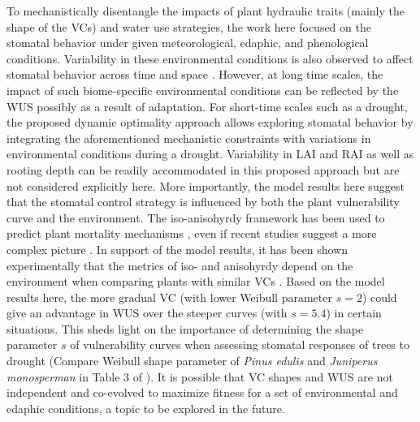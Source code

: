 \documentclass[utf8]{frontiersSCNS} %
\begin{document}
To mechanistically disentangle the impacts of plant hydraulic traits (mainly the shape of the VCs) and water use strategies, the work here focused on the stomatal behavior under given meteorological, edaphic, and phenological conditions. Variability in these environmental conditions is also observed to affect stomatal behavior across time and space \citep{feng2018beyond,novick2019beyond}. However, at long time scales, the impact of such biome-specific environmental conditions can be reflected by the WUS possibly as a result of adaptation. For short-time scales such as a drought, the proposed dynamic optimality approach allows exploring stomatal behavior by integrating the aforementioned mechanistic constraints with variations in environmental conditions during a drought. Variability in LAI and RAI as well as rooting depth can be readily accommodated in this proposed approach but are not considered explicitly here. More importantly, the model results here suggest that the stomatal control strategy is influenced by both the plant vulnerability curve and the environment. The iso-anisohyrdy framework has been used to predict plant mortality mechanisms \citep{mcdowell_mechanisms_2008}, even if recent studies suggest a more complex picture \citep{meinzer_dynamics_2014,martinezvilalta_water_2017}. In support of the model results, it has been shown experimentally that the metrics of iso- and anisohyrdy depend on the environment when comparing plants with similar VCs \citep{hochberg_iso/anisohydry:_2018}.  Based on the model results here, the more gradual VC (with lower Weibull parameter $s=2$) could give an advantage in WUS over the steeper curves (with $s=5.4$) in certain situations. This sheds light on the importance of determining the shape parameter $s$ of vulnerability curves when assessing stomatal responses of trees to drought (Compare Weibull shape parameter of \textit{Pinus edulis} and \textit{Juniperus monosperman} in Table 3 of \citet{plaut_hydraulic_2012}). It is possible that VC shapes and WUS are not independent and co-evolved to maximize fitness for a set of environmental and edaphic conditions, a topic to be explored in the future. 
\end{document}
